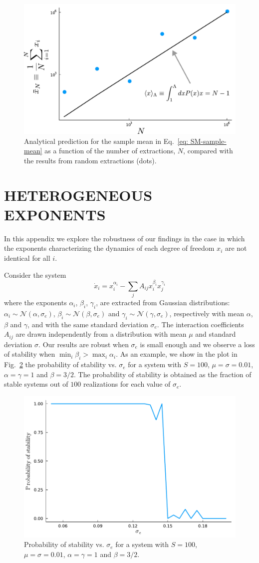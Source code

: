 \documentclass[
 pre,
 twocolumn,
 amsmath,
 amssymb,
 aps,
]{revtex4-2}
\begin{document}
\begin{figure}[h!]
  \includegraphics[width=.475\textwidth]{cut-off-justification.pdf}
  \caption{Analytical prediction for the sample mean in Eq.~\eqref{eq: SM-sample-mean} as a function of the number of extractions, $N$, compared with the results from random extractions (dots).
  }
  \label{fig: SM-cut-off}
\end{figure}

\section{HETEROGENEOUS EXPONENTS}
\label{appendix b}
In this appendix we explore the robustness of our findings in the case in which the exponents characterizing the dynamics of each degree of freedom $x_i$ are not identical for all $i$.

Consider the system
\begin{equation}
  \dot{x}_i = x_i^{\alpha_i} - \sum_jA_{ij}x_i^{\beta_i}x_j^{\gamma_i}
\end{equation}
where the exponents $\alpha_i$, $\beta_i$, $\gamma_i$, are extracted from Gaussian distributions: $\alpha_i\sim\mathcal N(\alpha,\sigma_e)$, $\beta_i\sim\mathcal N(\beta,\sigma_e)$ and $\gamma_i\sim\mathcal N(\gamma,\sigma_e)$, respectively with mean $\alpha$, $\beta$ and $\gamma$, and with the same standard deviation $\sigma_e$. The interaction coefficients $A_{ij}$ are drawn independently from a distribution with mean $\mu$ and standard deviation $\sigma$.
Our results are robust when $\sigma_e$ is small enough and we observe a loss of stability when $\min_i\beta_i>\max_i\alpha_i$.
As an example, we show in the plot in Fig.~\ref{fig: SM-het-exp} the probability of stability vs. $\sigma_e$ for a system with $S=100$, $\mu=\sigma=0.01$, $\alpha=\gamma=1$ and $\beta=3/2$.
The probability of stability is obtained as the fraction of stable systems out of $100$ realizations for each value of $\sigma_e$.

\begin{figure}[h!]
  \includegraphics[width=.475\textwidth]{stoch-exp.pdf}
  \caption{Probability of stability vs. $\sigma_e$ for a system with $S=100$, $\mu=\sigma=0.01$, $\alpha=\gamma=1$ and $\beta=3/2$.
  }
  \label{fig: SM-het-exp}
\end{figure}



\end{document}
